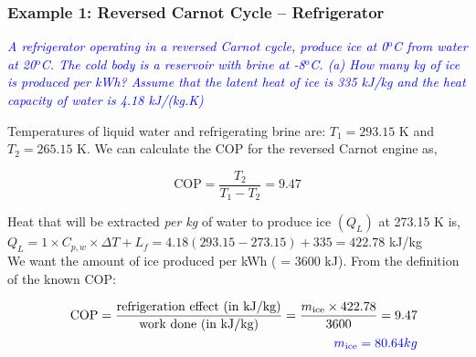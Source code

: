 \documentclass[10pt,compress]{beamer}
\newcommand{\frc}{\displaystyle\frac}
\begin{document}


\begin{frame}
 \frametitle{Example 1: Reversed Carnot Cycle -- Refrigerator}
  \textcolor{blue}{{\it A refrigerator operating in a reversed Carnot cycle, produce ice at 0$^{\text{o}}$C from water at 20$^{\text{o}}$C. The cold body is a reservoir with brine at -8$^{\text{o}}$C.  (a) How many kg of ice is produced per kWh?  Assume that the latent heat of ice is 335 kJ/kg and the heat capacity of water is 4.18 kJ/(kg.K)}}

Temperatures of liquid water and refrigerating brine are: $T_{1}=293.15$ K and $T_{2}=265.15$ K. We can calculate the COP for the reversed Carnot engine as,

\begin{displaymath}
\text{COP}=\frc{T_{2}}{T_{1}-T_{2}} = 9.47
\end{displaymath}

Heat that will be extracted {\it per kg} of water to produce ice $\left(Q_{L}\right)$ at 273.15 K is,\\

$Q_{L}= 1 \times C_{p,w} \times \Delta T + L_{f} = 4.18 \left( 293.15-273.15 \right) + 335 = 422.78$ kJ/kg\\

We want the amount of ice produced per kWh ( = 3600 kJ). From the definition of the known COP:

\begin{eqnarray}
&&\text{COP} = \frc{\text{refrigeration effect (in kJ/kg)}}{\text{work done (in kJ/kg)}} = \frc{m_{\text{ice}} \times 422.78}{3600} = 9.47\nonumber\\
&& \textcolor{blue}{m_{\text{ice}} = 80.64 kg} \nonumber 
\end{eqnarray}

\end{frame}
\end{document}
